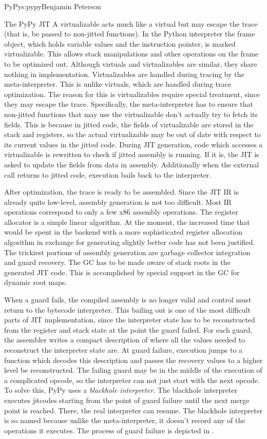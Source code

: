 \begin{aosachapter}{PyPy}{s:pypy}{Benjamin Peterson}
\begin{aosasect1}{The PyPy JIT}
A virtualizable acts much like a virtual but may escape the trace (that is, be
passed to non-jitted functions). In the Python interpreter the frame object,
which holds variable values and the instruction pointer, is marked
virtualizable. This allows stack manipulations and other operations on the frame
to be optimized out. Although virtuals and virtualizables are similar, they
share nothing in implementation. Virtualizables are handled during tracing by
the meta-interpreter. This is unlike virtuals, which are handled during trace
optimization. The reason for this is virtualizables require special treatment,
since they may escape the trace. Specifically, the meta-interpreter has to
ensure that non-jitted functions that may use the virtualizable don't actually
try to fetch its fields. This is because in jitted code, the fields of
virtualizable are stored in the stack and registers, so the actual virtualizable
may be out of date with respect to its current values in the jitted code. During
JIT generation, code which accesses a virtualizable is rewritten to check if
jitted assembly is running. If it is, the JIT is asked to update the fields from
data in assembly. Additionally when the external call returns to jitted code,
execution bails back to the interpreter.

After optimization, the trace is ready to be assembled. Since the JIT IR is
already quite low-level, assembly generation is not too difficult. Most IR
operations correspond to only a few x86 assembly operations. The register
allocator is a simple linear algorithm. At the moment, the increased time that
would be spent in the backend with a more sophisticated register allocation
algorithm in exchange for generating slightly better code has not been
justified. The trickiest portions of assembly generation are garbage collector
integration and guard recovery. The GC has to be made aware of stack roots in
the generated JIT code. This is accomplished by special support in the GC for
dynamic root maps.

When a guard fails, the compiled assembly is no longer valid and control must
return to the bytecode interpreter. This bailing out is one of the most
difficult parts of JIT implementation, since the interpreter state has to be
reconstructed from the register and stack state at the point the guard
failed. For each guard, the assembler writes a compact description of where all
the values needed to reconstruct the interpreter state are. At guard failure,
execution jumps to a function which decodes this description and passes the
recovery values to a higher level be reconstructed. The failing guard may be in
the middle of the execution of a complicated opcode, so the interpreter can not
just start with the next opcode. To solve this, PyPy uses a \emph{blackhole
  interpreter}. The blackhole interpreter executes jitcodes starting from the
point of guard failure until the next merge point is reached. There, the real
interpreter can resume. The blackhole interpreter is so named because unlike the
meta-interpreter, it doesn't record any of the operations it executes. The
process of guard failure is depicted in .


\end{aosasect1}
\end{aosachapter}
